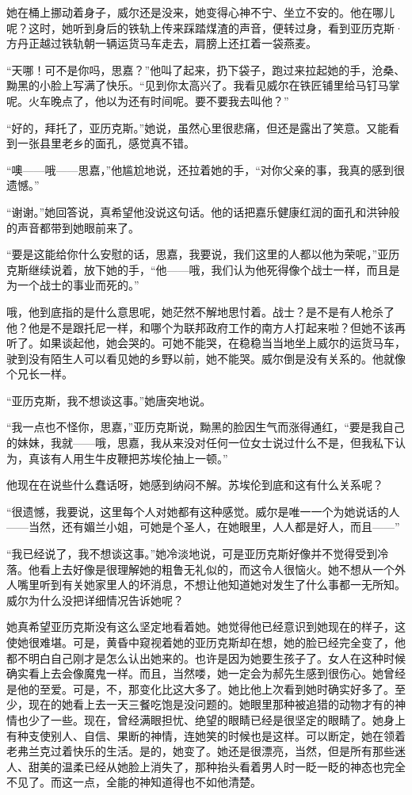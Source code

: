 \par 她在桶上挪动着身子，威尔还是没来，她变得心神不宁、坐立不安的。他在哪儿呢？这时，她听到身后的铁轨上传来踩踏煤渣的声音，便转过身，看到亚历克斯·方丹正越过铁轨朝一辆运货马车走去，肩膀上还扛着一袋燕麦。
\par “天哪！可不是你吗，思嘉？”他叫了起来，扔下袋子，跑过来拉起她的手，沧桑、黝黑的小脸上写满了快乐。“见到你太高兴了。我看见威尔在铁匠铺里给马钉马掌呢。火车晚点了，他以为还有时间呢。要不要我去叫他？”
\par “好的，拜托了，亚历克斯。”她说，虽然心里很悲痛，但还是露出了笑意。又能看到一张县里老乡的面孔，感觉真不错。
\par “噢——哦——思嘉，”他尴尬地说，还拉着她的手，“对你父亲的事，我真的感到很遗憾。”
\par “谢谢。”她回答说，真希望他没说这句话。他的话把嘉乐健康红润的面孔和洪钟般的声音都带到她眼前来了。
\par “要是这能给你什么安慰的话，思嘉，我要说，我们这里的人都以他为荣呢，”亚历克斯继续说着，放下她的手，“他——哦，我们认为他死得像个战士一样，而且是为一个战士的事业而死的。”
\par 哦，他到底指的是什么意思呢，她茫然不解地思忖着。战士？是不是有人枪杀了他？他是不是跟托尼一样，和哪个为联邦政府工作的南方人打起来啦？但她不该再听了。如果谈起他，她会哭的。可她不能哭，在稳稳当当地坐上威尔的运货马车，驶到没有陌生人可以看见她的乡野以前，她不能哭。威尔倒是没有关系的。他就像个兄长一样。
\par “亚历克斯，我不想谈这事。”她唐突地说。
\par “我一点也不怪你，思嘉，”亚历克斯说，黝黑的脸因生气而涨得通红，“要是我自己的妹妹，我就——哦，思嘉，我从来没对任何一位女士说过什么不是，但我私下认为，真该有人用生牛皮鞭把苏埃伦抽上一顿。”
\par 他现在在说些什么蠢话呀，她感到纳闷不解。苏埃伦到底和这有什么关系呢？
\par “很遗憾，我要说，这里每个人对她都有这种感觉。威尔是唯一一个为她说话的人——当然，还有媚兰小姐，可她是个圣人，在她眼里，人人都是好人，而且——”
\par “我已经说了，我不想谈这事。”她冷淡地说，可是亚历克斯好像并不觉得受到冷落。他看上去好像是很理解她的粗鲁无礼似的，而这令人很恼火。她不想从一个外人嘴里听到有关她家里人的坏消息，不想让他知道她对发生了什么事都一无所知。威尔为什么没把详细情况告诉她呢？
\par 她真希望亚历克斯没有这么坚定地看着她。她觉得他已经意识到她现在的样子，这使她很难堪。可是，黄昏中窥视着她的亚历克斯却在想，她的脸已经完全变了，他都不明白自己刚才是怎么认出她来的。也许是因为她要生孩子了。女人在这种时候确实看上去会像魔鬼一样。而且，当然喽，她一定会为郝先生感到很伤心。她曾经是他的至爱。可是，不，那变化比这大多了。她比他上次看到她时确实好多了。至少，现在的她看上去一天三餐吃饱是没问题的。她眼里那种被追猎的动物才有的神情也少了一些。现在，曾经满眼担忧、绝望的眼睛已经是很坚定的眼睛了。她身上有种支使别人、自信、果断的神情，连她笑的时候也是这样。可以断定，她在领着老弗兰克过着快乐的生活。是的，她变了。她还是很漂亮，当然，但是所有那些迷人、甜美的温柔已经从她脸上消失了，那种抬头看着男人时一眨一眨的神态也完全不见了。而这一点，全能的神知道得也不如他清楚。
